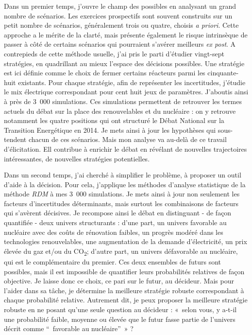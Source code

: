 Dans un premier temps, j'ouvre le champ des possibles en analysant un grand nombre de scénarios. Les exercices prospectifs sont souvent construits sur un petit nombre de scénarios, généralement trois ou quatre, choisis \textit{a priori}. Cette approche a le mérite de la clarté, mais présente également le risque intrinsèque de passer à côté de certains scénarios qui pourraient s'avérer meilleurs \textit{ex post}.
A contrepieds de cette méthode usuelle, j'ai pris le parti d'étudier vingt-sept stratégies, en quadrillant au mieux l'espace des décisions possibles. Une stratégie est ici définie comme le choix de fermer certains réacteurs parmi les cinquante-huit existants. Pour chaque stratégie, afin de représenter les incertitudes, j'étudie le mix électrique correspondant pour cent huit jeux de paramètres. J'aboutis ainsi à près de 3~000 simulations.
Ces simulations permettent de retrouver les termes actuels du débat sur la place des renouvelables et du nucléaire : on y retrouve notamment les quatre positions qui ont structuré le Débat National sur la Transition Energétique en 2014. 
Je mets ainsi à jour les hypothèses qui sous-tendent chacun de ces scénarios. 
Mais mon analyse va au-delà de ce travail d'élicitation. Ell contribue à enrichir le débat en révélant de nouvelles trajectoires intéressantes, de nouvelles stratégies potentielles. 

Dans un second temps, j'ai cherché à simplifier le problème, à proposer un outil d'aide à la décision. 
Pour cela, j'applique les méthodes d'analyse statistique de la méthode \textit{RDM} à mes 3~000 simulations. Je mets ainsi à jour non seulement les facteurs d'incertitudes déterminants, mais surtout les combinaisons de facteurs qui s'avèrent décisives.
Je recompose ainsi le débat en distinguant - de façon quantifiée - deux univers structurants : d'une part, un univers favorable au nucléaire avec des coûts de rénovation faibles, un progrès modéré dans les technologies renouvelables, une augmentation de la demande d'électricité, un prix élevée du gaz et/ou du CO\textsubscript{2}; d'autre part, un univers défavorable au nucléaire, qui est le complémentaire du premier.
Ces deux ensembles de futurs sont possibles, mais il est impossible de quantifier leurs probabilités relatives de façon objective. Je laisse donc ce choix, ce pari sur le futur, au décideur. 
Mais pour l'aider dans sa tâche, je détermine la meilleure stratégie robuste correspondant à chaque probabilité relative. Autrement dit, je peux proposer la meilleure stratégie robuste en ne posant qu'une seule question au décideur : «~selon vous, y a-t-il une probabilité faible, moyenne ou élevée que le futur fasse partie de l'univers décrit comme “~favorable au nucléaire”~» ?
 
